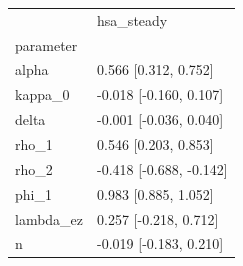 \begin{tabular}{ll}
\toprule
 & hsa\_steady \\
parameter &  \\
\midrule
alpha & 0.566 [0.312, 0.752] \\
kappa\_0 & -0.018 [-0.160, 0.107] \\
delta & -0.001 [-0.036, 0.040] \\
rho\_1 & 0.546 [0.203, 0.853] \\
rho\_2 & -0.418 [-0.688, -0.142] \\
phi\_1 & 0.983 [0.885, 1.052] \\
lambda\_ez & 0.257 [-0.218, 0.712] \\
n & -0.019 [-0.183, 0.210] \\
\bottomrule
\end{tabular}
